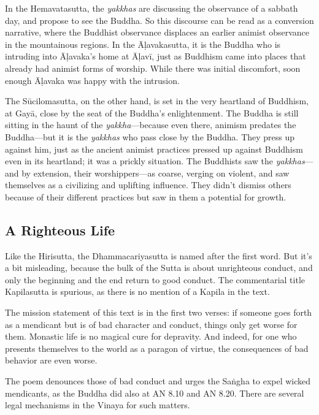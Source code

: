 \documentclass[12pt,openany]{book}%
\begin{document}
In the Hemavatasutta, the \textit{yakkhas} are discussing the observance of a sabbath day, and propose to see the Buddha. So this discourse can be read as a conversion narrative, where the Buddhist observance displaces an earlier animist observance in the mountainous regions. In the \textsanskrit{Āḷavakasutta}, it is the Buddha who is intruding into \textsanskrit{Āḷavaka}’s home at \textsanskrit{Āḷavī}, just as Buddhism came into places that already had animist forms of worship. While there was initial discomfort, soon enough \textsanskrit{Āḷavaka} was happy with the intrusion.

The \textsanskrit{Sūcilomasutta}, on the other hand, is set in the very heartland of Buddhism, at \textsanskrit{Gayā}, close by the seat of the Buddha’s enlightenment. The Buddha is still sitting in the haunt of the \textit{yakkha}—because even there, animism predates the Buddha—but it is the \textit{yakkhas} who pass close by the Buddha. They press up against him, just as the ancient animist practices pressed up against Buddhism even in its heartland; it was a prickly situation. The Buddhists saw the \textit{yakkhas}—and by extension, their worshippers—as coarse, verging on violent, and saw themselves as a civilizing and uplifting influence. They didn’t dismiss others because of their different practices but saw in them a potential for growth.

\subsection*{A Righteous Life}

Like the Hirisutta, the Dhammacariyasutta is named after the first word. But it’s a bit misleading, because the bulk of the Sutta is about unrighteous conduct, and only the beginning and the end return to good conduct. The commentarial title Kapilasutta is spurious, as there is no mention of a Kapila in the text.

The mission statement of this text is in the first two verses: if someone goes forth as a mendicant but is of bad character and conduct, things only get worse for them. Monastic life is no magical cure for depravity. And indeed, for one who presents themselves to the world as a paragon of virtue, the consequences of bad behavior are even worse.

The poem denounces those of bad conduct and urges the \textsanskrit{Saṅgha} to expel wicked mendicants, as the Buddha did also at AN 8.10 and AN 8.20. There are several legal mechanisms in the Vinaya for such matters.
\end{document}
